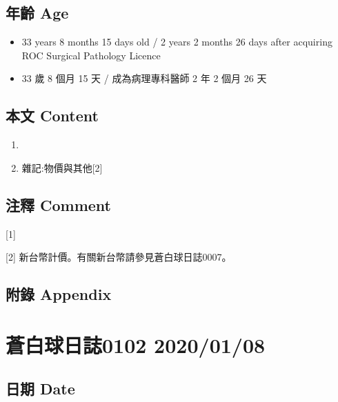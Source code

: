 \documentclass[
]{article}
\providecommand{\tightlist}{%
  \setlength{\itemsep}{0pt}\setlength{\parskip}{0pt}}
\begin{document}
\hypertarget{ux5e74ux9f61-age-6}{%
\subsection{年齡 Age}\label{ux5e74ux9f61-age-6}}

\begin{itemize}
\tightlist
\item
  33 years 8 months 15 days old / 2 years 2 months 26 days after
  acquiring ROC Surgical Pathology Licence
\item
  33 歲 8 個月 15 天 / 成為病理專科醫師 2 年 2 個月 26 天
\end{itemize}

\hypertarget{ux672cux6587-content-6}{%
\subsection{本文 Content}\label{ux672cux6587-content-6}}

\begin{enumerate}
\def\labelenumi{\arabic{enumi}.}
\item
\item
  雜記:物價與其他{[}2{]}
\end{enumerate}

\hypertarget{ux6ce8ux91cb-comment-6}{%
\subsection{注釋 Comment}\label{ux6ce8ux91cb-comment-6}}

{[}1{]}

{[}2{]} 新台幣計價。有關新台幣請參見蒼白球日誌0007。

\hypertarget{ux9644ux9304-appendix-6}{%
\subsection{附錄 Appendix}\label{ux9644ux9304-appendix-6}}

\hypertarget{ux84bcux767dux7403ux65e5ux8a8c0102-20200108}{%
\section{蒼白球日誌0102
2020/01/08}\label{ux84bcux767dux7403ux65e5ux8a8c0102-20200108}}

\hypertarget{ux65e5ux671f-date-7}{%
\subsection{日期 Date}\label{ux65e5ux671f-date-7}}
\end{document}
